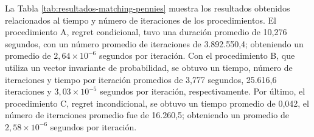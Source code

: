 La Tabla \ref{tab:resultados-matching-pennies} muestra los resultados obtenidos relacionados al tiempo y número de iteraciones de los procedimientos. El procedimiento A, regret condicional, tuvo una duración promedio de 10,276 segundos, con un número promedio de iteraciones de 3.892.550,4; obteniendo un promedio de $2,64 {\times} 10^{-6}$ segundos por iteración. Con el procedimiento B, que utiliza un vector invariante de probabilidad, se obtuvo un tiempo, número de iteraciones y tiempo por iteración promedios de 3,777 segundos, 25.616,6 iteraciones y $3,03 {\times} 10^{-5}$ segundos por iteración, respectivamente. Por último, el procedimiento C, regret incondicional, se obtuvo un tiempo promedio de 0,042, el número de iteraciones promedio fue de 16.260,5; obteniendo un promedio de $2,58 {\times} 10^{-6}$ segundos por iteración. 

